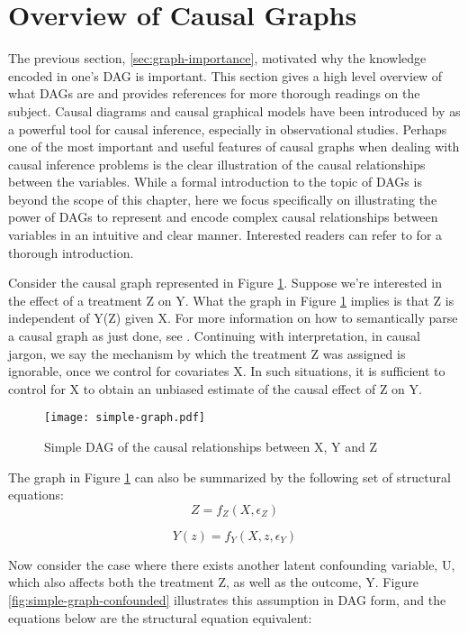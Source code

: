 \section{Overview of Causal Graphs}
\label{sec:graph-overview}
The previous section, \ref{sec:graph-importance}, motivated why the knowledge encoded in one's DAG is important.
This section gives a high level overview of what DAGs are and provides references for more thorough readings on the subject.
Causal diagrams and causal graphical models have been introduced by \citet{pearl_1995_causal} as a powerful tool for causal inference, especially in observational studies.
Perhaps one of the most important and useful features of causal
graphs when dealing with causal inference problems is the clear illustration
of the causal relationships between the variables.
While a formal introduction to the topic of DAGs is beyond the scope of this chapter,
here we focus specifically on illustrating the power of DAGs to represent
and encode complex causal relationships between variables in an intuitive and
clear manner.
Interested readers can refer to \citet{pearl_causality_2000} for a thorough introduction.

Consider the causal graph represented in Figure \ref{fig:simple-graph}.
Suppose we're interested in the effect of a treatment Z on Y.
What the graph in Figure \ref{fig:simple-graph} implies is that Z is
independent of Y(Z) given X.
For more information on how to semantically parse a causal graph as just done, see \citet[Ch 11.1]{pearl_2009_causality}.
Continuing with interpretation, in causal jargon, we say the mechanism by which the treatment Z was assigned is ignorable, once we control for covariates X.
In such situations, it is sufficient to control for X to obtain an unbiased estimate of the causal effect of Z on Y.

\begin{figure}[h!]
   \centering
   \texttt{[image: simple-graph.pdf]}
   \caption{Simple DAG of the causal relationships between X, Y and Z}
   \label{fig:simple-graph}
\end{figure}

The graph in Figure \ref{fig:simple-graph} can also be summarized by the following set of structural equations:
\[Z = f_Z(X, \epsilon_Z)  \]

\[Y(z) = f_Y(X, z, \epsilon_Y)  \]

Now consider the case where there exists another latent confounding variable, U, which also affects both the treatment Z, as well as the outcome, Y.
Figure \ref{fig:simple-graph-confounded} illustrates this assumption in DAG form, and the equations below are the structural equation equivalent:

